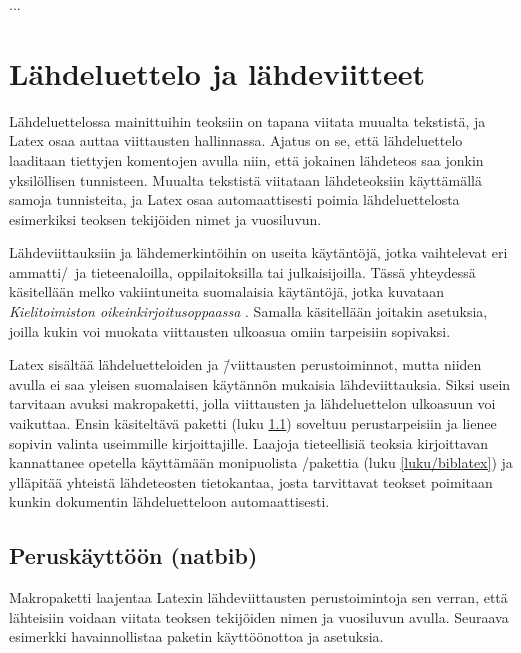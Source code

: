 ...

\section{Lähdeluettelo ja lähdeviitteet}
\label{luku/lähteet}

Lähdeluettelossa mainittuihin teoksiin on tapana viitata muualta
tekstistä, ja Latex osaa auttaa viittausten hallinnassa. Ajatus on se,
että lähdeluettelo laaditaan tiettyjen komentojen avulla niin, että
jokainen lähdeteos saa jonkin yksilöllisen tunnisteen. Muualta tekstistä
viitataan lähdeteoksiin käyttämällä samoja tunnisteita, ja Latex osaa
automaattisesti poimia lähdeluettelosta esimerkiksi teoksen tekijöiden
nimet ja vuosiluvun.

Lähdeviittauksiin ja lähdemerkintöihin on useita käytäntöjä, jotka
vaihtelevat eri ammatti\-/\ ja tieteenaloilla, oppilaitoksilla tai
julkaisijoilla. Tässä yhteydessä käsitellään melko vakiintuneita
suomalaisia käytäntöjä, jotka kuvataan \emph{Kielitoimiston
  oikeinkirjoitusoppaassa} \parencite{kt_oik}. Samalla käsitellään
joitakin asetuksia, joilla kukin voi muokata viittausten ulkoasua omiin
tarpeisiin sopivaksi.

Latex sisältää lähdeluetteloiden ja \=/viittausten perustoiminnot, mutta
niiden avulla ei saa yleisen suomalaisen käytännön mukaisia
lähdeviittauksia. Siksi usein tarvitaan avuksi makropaketti, jolla
viittausten ja lähdeluettelon ulkoasuun voi vaikuttaa. Ensin käsiteltävä
paketti  (luku \ref{luku/natbib}) soveltuu
perustarpeisiin ja lienee sopivin valinta useimmille kirjoittajille.
Laajoja tieteellisiä teoksia kirjoittavan kannattanee opetella
käyttämään monipuolista \-/pakettia (luku
\ref{luku/biblatex}) ja ylläpitää yhteistä lähdeteosten tietokantaa,
josta tarvittavat teokset poimitaan kunkin dokumentin lähdeluetteloon
automaattisesti.

\subsection{Peruskäyttöön (natbib)}
\label{luku/natbib}

Makropaketti  laajentaa Latexin
lähdeviittausten perustoimintoja sen verran, että lähteisiin voidaan
viitata teoksen tekijöiden nimen ja vuosiluvun avulla. Seuraava
esimerkki havainnollistaa paketin käyttöönottoa ja asetuksia.

\begin{koodilohkosis}
\usepackage{natbib}
\end{koodilohkosis}

